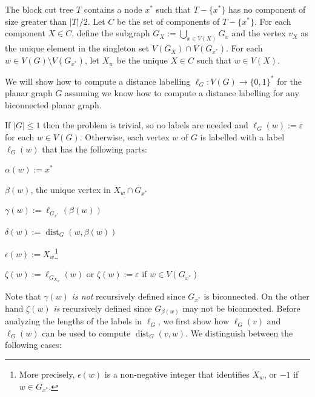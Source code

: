 \documentclass{patmorin}
\DeclareMathOperator{\dist}{dist}
\begin{document}
The block cut tree $T$ contains a node $x^*$ such that $T-\{x^*\}$ has no component of size greater than $|T|/2$.  Let $C$ be the set of components of $T-\{x^*\}$.  For each component $X\in C$, define the subgraph $G_X:=\bigcup_{x\in V(X)} G_x$ and the vertex $v_X$ as the unique element in the singleton set $V(G_X)\cap V(G_{x^*})$.  For each $w\in V(G)\setminus V(G_{x^*})$, let $X_w$ be the unique $X\in C$ such that $w\in V(X)$.




We will show how to compute a distance labelling $\ell_G:V(G)\to\{0,1\}^*$ for the planar graph $G$ assuming we know how to compute a distance labelling for any biconnected planar graph.

If $|G|\le 1$ then the problem is trivial, so no labels are needed and $\ell_G(w):=\varepsilon$ for each $w\in V(G)$.  Otherwise, each vertex $w$ of $G$ is labelled with a label $\ell_G(w)$ that has the following parts:
\begin{compactenum}
    \item $\alpha(w):=x^*$
    \item $\beta(w)$, the unique vertex in $X_w\cap G_{x^*}$
    \item $\gamma(w):=\ell_{G_{x^*}}(\beta(w))$
    \item $\delta(w):=\dist_G(w,\beta(w))$
    \item $\epsilon(w):=X_w$\footnote{More precisely, $\epsilon(w)$ is a non-negative integer that identifies $X_w$, or $-1$ if $w\in G_{x^*}$.}
    \item $\zeta(w):=\ell_{G_{X_w}}(w)$ or $\zeta(w):=\varepsilon$ if $w\in V(G_{x^*})$
\end{compactenum}

Note that $\gamma(w)$ \emph{is not} recursively defined since $G_{x^*}$ is biconnected.  On the other hand $\zeta(w)$ \emph{is} recursively defined since $G_{\beta(w)}$ may not be biconnected.  Before analyzing the lengths of the labels in $\ell_G$, we first show how $\ell_G(v)$ and $\ell_G(w)$ can be used to compute $\dist_G(v,w)$.  We distinguish between the following cases:
\end{document}
